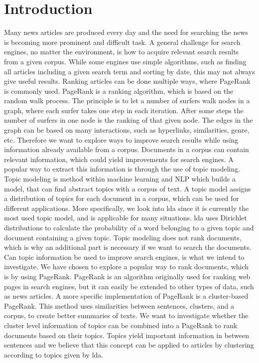\section{Introduction} 

Many news articles are produced every day and the need for searching the news is becoming more prominent and difficult task.
A general challenge for search engines, no matter the environment, is how to acquire relevant search results from a given corpus. 
While some engines use simple algorithms, such as finding all articles including a given search term and sorting by date, this may not always give useful results.
Ranking articles can be done multiple ways, where PageRank is commonly used\cite{google_pagerank2006}.
PageRank\cite{pagerank_1999} is a ranking algorithm, which is based on the random walk process.
The principle is to let a number of surfers walk nodes in a graph, where each surfer takes one step in each iteration.
After some steps the number of surfers in one node is the ranking of that given node.
The edges in the graph can be based on many interactions, such as hyperlinks, similarities, genre, etc.
Therefore we want to explore ways to improve search results while using information already available from a corpus.
Documents in a corpus can contain relevant information, which could yield improvements for search engines.
A popular way to extract this information is through the use of topic modeling.
Topic modeling is method within machine learning and \gls{NLP} which builds a model, that can find abstract topics with a corpus of text.
A topic model assigns a distribution of topics for each document in a corpus, which can be used for different applications.
More specifically, we look into \gls{lda} since it is currently the most used topic model, and is applicable for many situations\cite{lda}.
\gls{lda} uses Dirichlet distributions to calculate the probability of a word belonging to a given topic and document containing a given topic.
Topic modeling does not rank documents, which is why an additional part is necessary if we want to search the documents.
Can topic information be used to improve search engines, is what we intend to investigate.
We have chosen to explore a popular way to rank documents, which is by using PageRank.
PageRank is an algorithm originally used for ranking web pages in search engines, but it can easily be extended to other types of data, such as news articles.
A more specific implementation of PageRank is a cluster-based PageRank\cite{ClusterPageRank}.
This method uses similarities between sentences, clusters, and a corpus, to create better summaries of texts.
We want to investigate whether the cluster level information of topics can be combined into a PageRank to rank documents based on their topics.
Topics yield important information in \cite{ClusterPageRank} between sentences and we believe that this concept can be applied to articles by clustering according to topics given by \gls{lda}.


